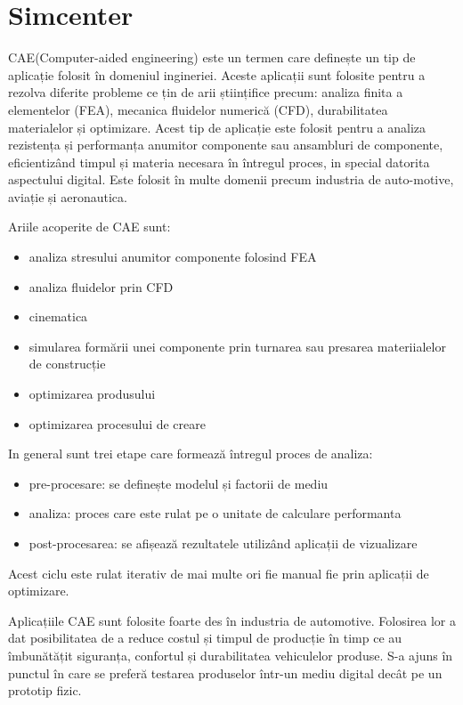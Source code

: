 \newpage
\section{Simcenter}

CAE(Computer-aided engineering) este un termen care definește un tip de aplicație folosit în domeniul ingineriei. Aceste aplicații sunt folosite pentru
 a rezolva diferite probleme ce țin de arii științifice precum: analiza finita a elementelor (FEA), mecanica fluidelor numerică (CFD), 
 durabilitatea materialelor și optimizare. Acest tip de aplicație este folosit pentru a analiza rezistența și performanța anumitor componente 
 sau ansambluri de componente, eficientizând timpul și materia necesara în întregul proces, in special datorita aspectului digital.
Este folosit în multe domenii precum industria de auto-motive, aviație și aeronautica.\newline

Ariile acoperite de CAE sunt:
\begin{itemize}
\item analiza stresului anumitor componente folosind FEA
\item analiza fluidelor prin CFD
\item cinematica
\item simularea formării unei componente prin turnarea sau presarea materiialelor de construcție
\item optimizarea produsului 
\item optimizarea procesului de creare
\end{itemize}

In general sunt trei etape care formează întregul proces de analiza:
\begin{itemize}
    \item pre-procesare: se definește modelul și factorii de mediu 
    \item analiza: proces care este rulat pe o unitate de calculare performanta
    \item post-procesarea: se afișează rezultatele utilizând aplicații de vizualizare
\end{itemize}

Acest ciclu este rulat iterativ de mai multe ori fie manual fie prin aplicații de optimizare.\newline

Aplicațiile CAE sunt folosite foarte des în industria de automotive. Folosirea lor a dat posibilitatea de a 
reduce costul și timpul de producție în timp ce au îmbunătățit siguranța, confortul și durabilitatea vehiculelor produse. 
S-a ajuns în punctul în care se preferă testarea produselor într-un mediu digital decât pe un prototip fizic.\newline

